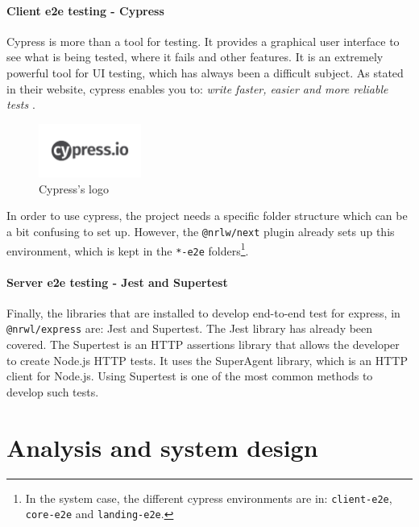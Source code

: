\documentclass[a4paper, 12pt, oneside]{book}
\begin{document}
\subsubsection{Client e2e testing - Cypress}
Cypress is more than a tool for testing. It provides a graphical user interface to see what is being tested, where it fails and other features. It is an extremely powerful tool for UI testing, which has always been a difficult subject. As stated in their website, cypress enables you to: \emph{write faster, easier and more reliable tests} \cite{cypress}.
\begin{figure}[H]
	\centering
	\includegraphics[width=0.3\textwidth]{assets/cypress-logo.png}
	\caption{Cypress's logo}
\end{figure}
In order to use cypress, the project needs a specific folder structure which can be a bit confusing to set up. However, the \texttt{@nrlw/next} plugin already sets up this environment, which is kept in the \texttt{*-e2e} folders\footnote{In the system case, the different cypress environments are in: \texttt{client-e2e}, \texttt{core-e2e} and \texttt{landing-e2e}.}.
\subsubsection{Server e2e testing - Jest and Supertest}
Finally, the libraries that are installed to develop end-to-end test for express, in \texttt{@nrwl/express} are: Jest and Supertest. The Jest library has already been covered. The Supertest is an HTTP assertions library that allows the developer to create Node.js HTTP tests. It uses the SuperAgent library, which is an HTTP client for Node.js. Using Supertest is one of the most common methods to develop such tests.
\chapter{Analysis and system design}
\end{document}
